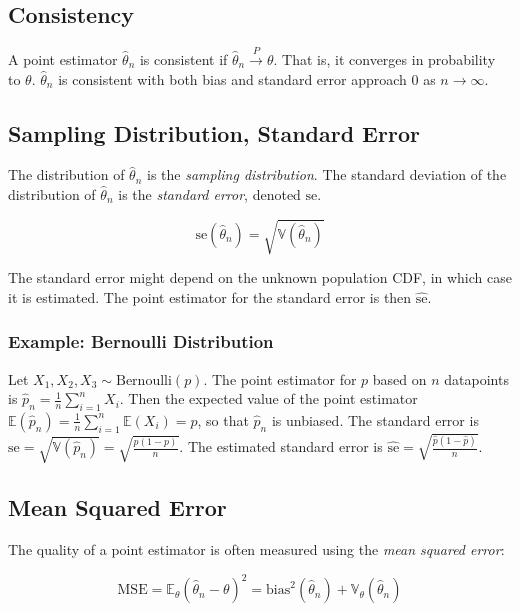 \subsection{Consistency}

A point estimator $\hat{\theta}_n$ is consistent if $\hat{\theta}_n \xrightarrow{P}\theta$. That is, it converges in probability to $\theta$. $\hat{\theta}_n$ is consistent with both bias and standard error approach $0$ as $n\rightarrow \infty$.


\subsection{Sampling Distribution, Standard Error}

The distribution of $\hat{\theta}_n$ is the \textit{sampling distribution}. The standard deviation of the distribution of $\hat{\theta}_n$ is the \textit{standard error}, denoted $\mathrm{se}$. 

\begin{equation}
\mathrm{se}(\hat{\theta}_n) = \sqrt{\mathbb{V}(\hat{\theta}_n)}
\end{equation} 

The standard error might depend on the unknown population CDF, in which case it is estimated. The point estimator for the standard error is then $\hat{\mathrm{se}}$. 



\subsubsection{Example: Bernoulli Distribution}

Let $X_1,X_2,X_3 \sim \mathrm{Bernoulli}(p)$. The point estimator for $p$ based on $n$ datapoints is $\hat{p}_n = \frac{1}{n}\sum_{i=1}^n X_i$. Then the expected value of the point estimator $\mathbb{E}(\hat{p}_n) = \frac{1}{n}\sum_{i=1}^n \mathbb{E}(X_i) = p$, so that $\hat{p}_n$ is unbiased. The standard error is $\mathrm{se} = \sqrt{\mathbb{V}(\hat{p}_n)} = \sqrt{\frac{p(1-p)}{n}}$. The estimated standard error is $\hat{\mathrm{se}} = \sqrt{\frac{\hat{p}(1-\hat{p})}{n}}$.


\subsection{Mean Squared Error}
The quality of a point estimator is often measured using the \textit{mean squared error}:

\begin{equation}
\mathrm{MSE} = \mathbb{E}_{\theta}(\hat{\theta}_n - \theta)^2 = \mathrm{bias}^2(\hat{\theta}_n) + \mathbb{V}_{\theta}(\hat{\theta}_n)
\end{equation}


